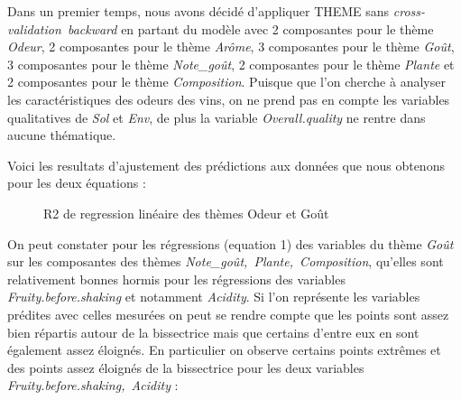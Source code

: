 \documentclass[a4paper,french,10pt]{article}
\begin{document}
Dans un premier temps, nous avons décidé d'appliquer THEME sans \textit{cross-validation~backward} en partant du modèle avec 2 composantes pour le thème \textit{Odeur}, 2 composantes pour le thème \textit{Arôme}, 3 composantes pour le thème \textit{Goût}, 3 composantes pour le thème \textit{Note\_goût}, 2 composantes pour le thème \textit{Plante} et 2 composantes pour le thème \textit{Composition}. Puisque que l'on cherche à analyser les caractéristiques des odeurs des vins, on ne prend pas en compte les variables qualitatives de \textit{Sol} et \textit{Env}, de plus la variable \textit{Overall.quality} ne rentre dans aucune thématique. \newline

Voici les resultats d'ajustement des prédictions aux données que nous obtenons pour les deux équations : 

\begin{figure}[htp] 
	\centering
	\hfill%
	\caption{R2 de regression linéaire des thèmes Odeur et Goût}
\end{figure}

On peut constater pour les régressions (equation 1) des variables du thème \textit{Goût} sur les composantes des thèmes \textit{Note\_goût,~Plante,~Composition}, qu'elles sont relativement bonnes hormis pour les régressions des variables \textit{Fruity.before.shaking} et notamment \textit{Acidity}. Si l'on représente les variables prédites avec celles mesurées on peut se rendre compte que les points sont assez bien répartis autour de la bissectrice mais que certains d'entre eux en sont également assez éloignés. En particulier on observe certains points extrêmes et des points assez éloignés de la bissectrice pour les deux variables \textit{Fruity.before.shaking,~Acidity} :
\end{document}
